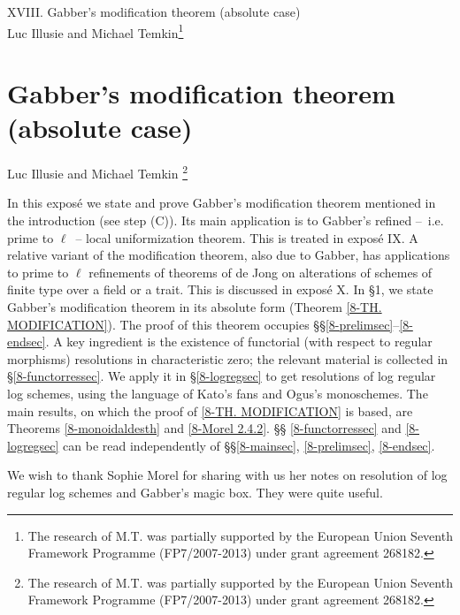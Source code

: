 \documentclass[10pt]{../fichiers-configuration-latex/smfart}
\begin{document}
\begin{center} XVIII. Gabber's modification theorem (absolute case)\\
Luc Illusie and Michael Temkin\footnote{The research of M.T. was partially supported by the
European Union Seventh Framework Programme (FP7/2007-2013) under grant agreement 268182.}
\end{center}

\tableofcontents

\else
{}
\chapter{Gabber's modification theorem
(absolute case)}
\begin{center}
Luc Illusie and Michael Temkin
\footnote{The research of M.T. was partially supported by the European Union Seventh
Framework Programme (FP7/2007-2013) under grant agreement 268182.}

\end{center}
\fi

In this expos\'e we state and prove Gabber's modification theorem
mentioned in the introduction (see step (C)). Its main application is
to Gabber's refined -- i.e. prime to $\ell$ -- local uniformization
theorem. This is treated in expos\'e IX. A relative variant of
the modification theorem, also due to Gabber, has applications to
prime to $\ell$ refinements of theorems of de Jong on alterations of
schemes of finite type over a field or a trait. This is discussed
in expos\'e X.  In \S1, we state Gabber's modification theorem in
its absolute form (Theorem \ref{8-TH. MODIFICATION}). The proof
of this theorem occupies \S\S\ref{8-prelimsec}--\ref{8-endsec}. A
key ingredient is the existence of functorial (with respect to
regular morphisms) resolutions in characteristic zero; the relevant
material is collected in \S\ref{8-functorressec}. We apply it in
\S\ref{8-logregsec} to get resolutions of log regular log schemes,
using the language of Kato's fans and Ogus's monoschemes. The main
results, on which the proof of \ref{8-TH. MODIFICATION} is based,
are Theorems \ref{8-monoidaldesth} and \ref{8-Morel 2.4.2}. \S\S
\ref{8-functorressec} and \ref{8-logregsec} can be read independently
of \S\S \ref{8-mainsec}, \ref{8-prelimsec}, \ref{8-endsec}.

We wish to thank Sophie Morel for sharing with us her notes
on resolution of log regular log schemes and Gabber's magic box.
They were quite useful.
\end{document}
